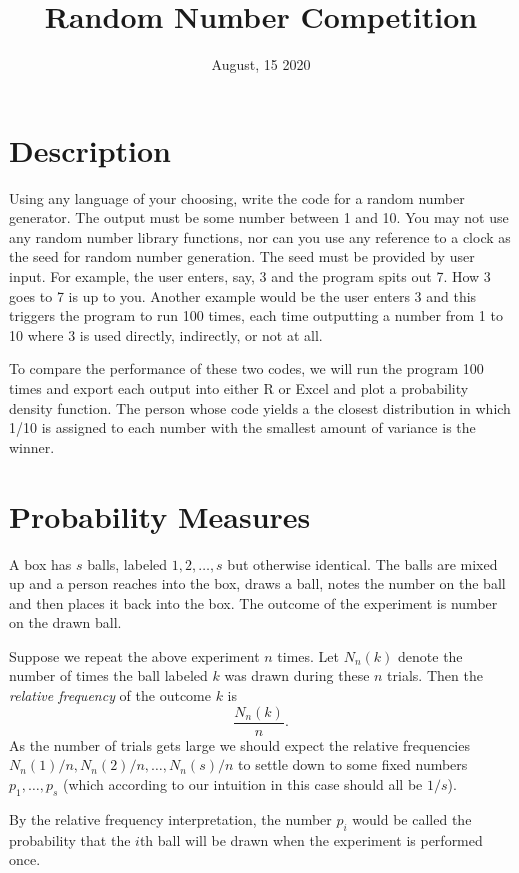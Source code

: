 \documentclass[leqno]{article}
\theoremstyle{definition}
\theoremstyle{remark}
\begin{document}
\title{Random Number Competition}
\author{ }
\date{August, 15 2020}
\maketitle

\section{Description}

Using any language of your choosing, write the code for a random number generator. The output must be some number between 1 and 10. You may not use any random number library functions, nor can you use any reference to a clock as the seed for random number generation. The seed must be provided by user input. For example, the user enters, say, 3 and the program spits out 7. How 3 goes to 7 is up to you. Another example would be the user enters 3 and this triggers the program to run 100 times, each time outputting a number from 1 to 10 where 3 is used directly, indirectly, or not at all.\par To compare the performance of these two codes, we will run the program 100 times and export each output into either R or Excel and plot a probability density function. The person whose code yields a the closest distribution in which 1/10 is assigned to each number with the smallest amount of variance is the winner.

\section{Probability Measures}
A box has $s$ balls, labeled $1,2,\dots, s$ but otherwise identical. The balls are mixed up and a person reaches into the box, draws a ball, notes the number on the ball and then places it back into the box. The outcome of the experiment is number on the drawn ball.\par Suppose we repeat the above experiment $n$ times. Let $N_n(k)$ denote the number of times the ball labeled $k$ was drawn during these $n$ trials. Then the \textit{relative frequency} of the outcome $k$ is
    \begin{equation*}
        \frac{N_n(k)}{n}.
    \end{equation*}
As the number of trials gets large we should expect the relative frequencies $N_n(1)/n, N_n(2)/n,\dots,N_n(s)/n$ to settle down to some fixed numbers $p_1,\dots,p_s$ (which according to our intuition in this case should all be $1/s$).\par By the relative frequency interpretation, the number $p_i$ would be called the probability that the $i$th ball will be drawn when the experiment is performed once. 
\end{document}

